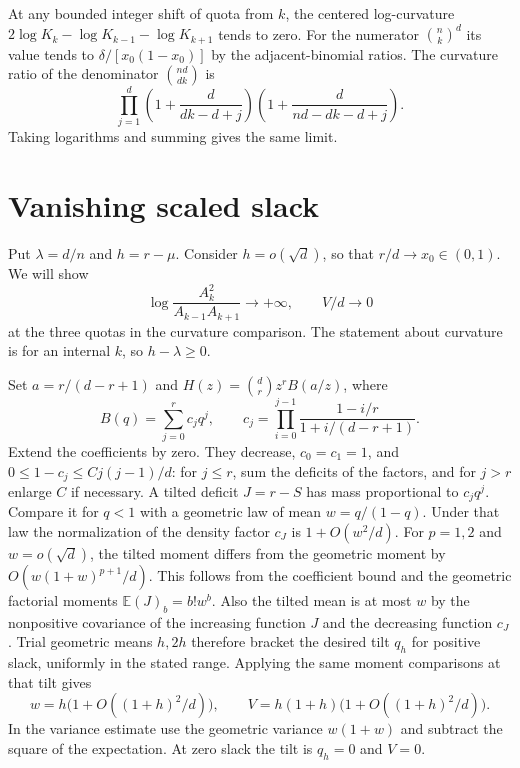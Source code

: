 \documentclass[11pt]{article}
\newcommand{\E}{\mathbb E}
\begin{document}
At any bounded integer shift of quota from $k$, the centered
log-curvature $2\log K_k-\log K_{k-1}-\log K_{k+1}$ tends to zero.
For the numerator $\binom nk^d$ its value tends to
$\delta/[x_0(1-x_0)]$ by the adjacent-binomial ratios. The curvature
ratio of the denominator $\binom{nd}{dk}$ is
\[
\prod_{j=1}^d
\left(1+\frac{d}{dk-d+j}\right)
\left(1+\frac{d}{nd-dk-d+j}\right).
\]
Taking logarithms and summing gives the same limit.

\section{Vanishing scaled slack}\label{sec:endpoint}

Put $\lambda=d/n$ and $h=r-\mu$. Consider $h=o(\sqrt d)$, so that
$r/d\to x_0\in(0,1)$. We will show
\begin{equation}\label{eq:edge-curv}
\log\frac{A_k^2}{A_{k-1}A_{k+1}}\longrightarrow+\infty,
\qquad V/d\longrightarrow0
\end{equation}
at the three quotas in the curvature comparison. The statement about
curvature is for an internal $k$, so $h-\lambda\ge0$.

Set $a=r/(d-r+1)$ and $H(z)=\binom dr z^r B(a/z)$, where
\[
B(q)=\sum_{j=0}^r c_jq^j,\qquad
c_j=\prod_{i=0}^{j-1}\frac{1-i/r}{1+i/(d-r+1)}.
\]
Extend the coefficients by zero. They decrease, $c_0=c_1=1$, and
$0\le1-c_j\le Cj(j-1)/d$: for $j\le r$, sum the deficits of the
factors, and for $j>r$ enlarge $C$ if necessary. A tilted deficit
$J=r-S$ has mass proportional to $c_jq^j$. Compare it for $q<1$
with a geometric law of mean $w=q/(1-q)$. Under that law the
normalization of the density factor $c_J$ is $1+O(w^2/d)$.
For $p=1,2$ and $w=o(\sqrt d)$, the tilted moment differs from the
geometric moment by $O(w(1+w)^{p+1}/d)$. This follows from the
coefficient bound and the geometric factorial moments
$\E(J)_b=b!w^b$. Also the tilted mean is at most $w$ by the
nonpositive covariance of the increasing function $J$ and the
decreasing function $c_J$. Trial geometric means $h,2h$ therefore
bracket the desired tilt $q_h$ for positive slack, uniformly in the
stated range. Applying the same moment comparisons at that tilt gives
\begin{equation}\label{eq:edge-var}
w=h\bigl(1+O((1+h)^2/d)\bigr),\qquad
V=h(1+h)\bigl(1+O((1+h)^2/d)\bigr).
\end{equation}
In the variance estimate use the geometric variance $w(1+w)$ and
subtract the square of the expectation. At zero slack the tilt is
$q_h=0$ and $V=0$.
\end{document}

